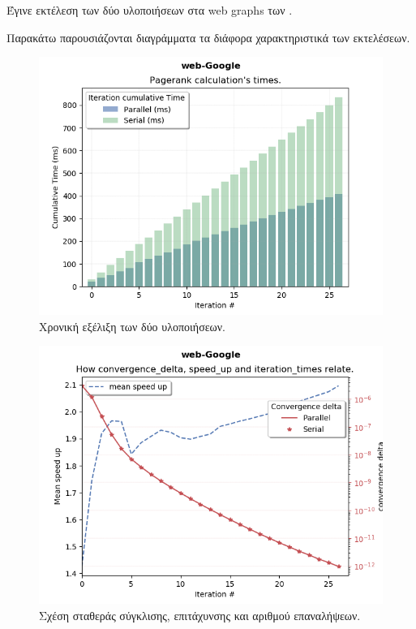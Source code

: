 Έγινε εκτέλεση των δύο υλοποιήσεων στα web graphs των \textcite{snapnets}.

Παρακάτω παρουσιάζονται διαγράμματα τα διάφορα χαρακτηριστικά των εκτελέσεων.
\begin{figure}
\includegraphics[width=\linewidth]{plots/it_time.png}
\caption{Χρονική εξέλιξη των δύο υλοποιήσεων.}
\end{figure}

\begin{figure}
\includegraphics[width=\linewidth]{plots/speed_up.png}
\caption{Σχέση σταθεράς σύγκλισης, επιτάχυνσης και αριθμού επαναλήψεων.}
\end{figure}

